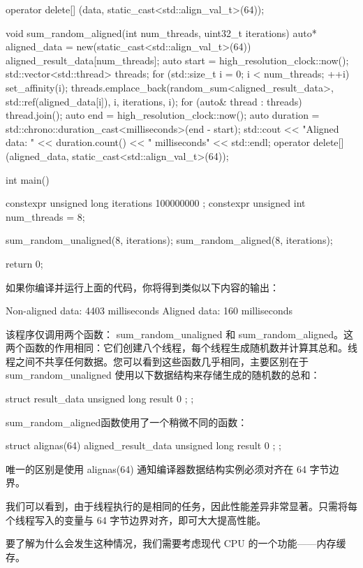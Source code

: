 \begin{cpp}
{    operator delete[] (data, static_cast<std::align_val_t>(64));
}

void sum_random_aligned(int num_threads, uint32_t iterations) {
    auto* aligned_data = new(static_cast<std::align_val_t>(64))
    aligned_result_data[num_threads];
    auto start = high_resolution_clock::now();
    std::vector<std::thread> threads;
    for (std::size_t i = 0; i < num_threads; ++i) {
        set_affinity(i);
        threads.emplace_back(random_sum<aligned_result_data>, std::ref(aligned_data[i]), i, iterations, i);
    }
    for (auto& thread : threads) {
        thread.join();
    }
    auto end = high_resolution_clock::now();
    auto duration = std::chrono::duration_cast<milliseconds>(end - start);
    std::cout << "Aligned data: " << duration.count() << " milliseconds" << std::endl;
    operator delete[] (aligned_data, static_cast<std::align_val_t>(64));
}

int main() {
    constexpr unsigned long iterations{ 100000000 };
    constexpr unsigned int num_threads = 8;

    sum_random_unaligned(8, iterations);
    sum_random_aligned(8, iterations);

    return 0;
}
\end{cpp}

如果你编译并运行上面的代码，你将得到类似以下内容的输出：

\begin{shell}
Non-aligned data: 4403 milliseconds
Aligned data: 160 milliseconds
\end{shell}

该程序仅调用两个函数： sum\_random\_unaligned 和 sum\_random\_aligned。这两个函数的作用相同：它们创建八个线程，每个线程生成随机数并计算其总和。线程之间不共享任何数据。您可以看到这些函数几乎相同，主要区别在于 sum\_random\_unaligned 使用以下数据结构来存储生成的随机数的总和：

\begin{cpp}
struct result_data {
    unsigned long result { 0 };
};
\end{cpp}

sum\_random\_aligned函数使用了一个稍微不同的函数：

\begin{cpp}
struct alignas(64) aligned_result_data {
    unsigned long result { 0 };
};
\end{cpp}

唯一的区别是使用 alignas(64) 通知编译器数据结构实例必须对齐在 64 字节边界。

我们可以看到，由于线程执行的是相同的任务，因此性能差异非常显著。只需将每个线程写入的变量与 64 字节边界对齐，即可大大提高性能。

要了解为什么会发生这种情况，我们需要考虑现代 CPU 的一个功能——内存缓存。












